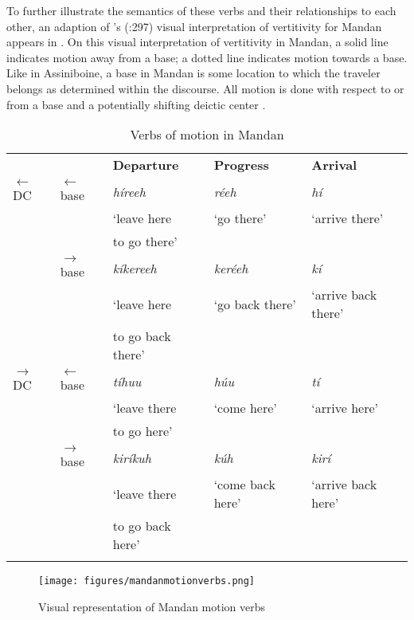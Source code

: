 To further illustrate the semantics of these verbs and their relationships to each other, an adaption of \citeauthor{cumberland2005}'s (\citeyear{cumberland2005}:297) visual interpretation of vertitivity for Mandan appears in . On this visual interpretation of vertitivity in Mandan, a solid line indicates motion away from a base; a dotted line indicates motion towards a base. Like in Assiniboine, a base in Mandan is some location to which the traveler belongs as determined within the discourse. All motion is done with respect to or from a base and a potentially shifting deictic center \citep[287]{cumberland2005}.


\begin{table}
\caption{Verbs of motion in Mandan} \label{mandanmotionverbtable}

    \begin{tabular}{lllll}
    \lsptoprule
~&
	~&
	\textbf{Departure}&
	\textbf{Progress}&
	\textbf{Arrival}\\
$\leftarrow$DC&
	$\leftarrow$base&
	\textit{híreeh}&
	\textit{réeh}&
	\textit{hí}\\
~&
	~&
	`leave here&
	`go there'&
	`arrive there'\\
~&
	~&
	to go there'&
	~&
	~\\
~&
	$\rightarrow$base&
	\textit{kíkereeh}&
	\textit{keréeh}&
	\textit{kí}\\
~&
	~&
	`leave here&
	`go back there'&
	`arrive back there'\\
~&
	~&
	to go back there'&
	~&
	~\\
$\rightarrow$DC&
	$\leftarrow$base&
	\textit{tíhuu}&
	\textit{húu}&
	\textit{tí}\\
~&
	~&
	`leave there&
	`come here'&
	`arrive here'\\
~&
	~&
	to go here'&
	~&
	~\\
~&
	$\rightarrow$base&
	\textit{kiríkuh}&
	\textit{kúh}&
	\textit{kirí}\\
~&
	~&
	`leave there&
	`come back here'&
	`arrive back here'\\
~&
	~&
	to go back here'&
	~&
	~\\

\lspbottomrule
    \end{tabular}
\end{table}

\begin{figure}
\caption{Visual representation of Mandan motion verbs}\label{visualmandanmotion}
\texttt{[image: figures/mandanmotionverbs.png]}

\end{figure}

